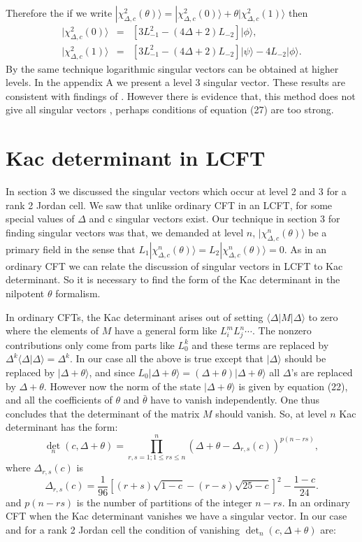 \documentclass[a4paper,11pt]{article}
\begin{document}
Therefore the if we write
$|\chi_{\Delta,c}^{2}(\theta)\rangle=|\chi_{\Delta,c}^{2}(0)\rangle+
\theta|\chi_{\Delta,c}^{2}(1)\rangle$ then
\begin{eqnarray}
|\chi_{\Delta,c}^{2}(0)\rangle&=&\left[3L_{-1}^{2}-(4\Delta+2)L_{-2}\right]|\phi\rangle ,\nonumber\\
|\chi_{\Delta,c}^{2}(1)\rangle&=&\left[3L_{-1}^{2}-(4\Delta+2)L_{-2}\right]
|\psi\rangle-4L_{-2}|\phi\rangle .
\end{eqnarray}
By the same technique logarithmic singular vectors can be obtained
at higher levels. In the appendix A we present a level 3 singular
vector. These results are consistent with findings of
\cite{Fl-Sing}. However there is evidence that, this method does
not give all singular vectors \cite{Private}, perhaps conditions
of equation (27) are too strong.
\section{Kac determinant in LCFT}
In section 3 we discussed the singular vectors which occur at
level 2 and 3 for a rank 2 Jordan cell. We saw that unlike
ordinary CFT in an LCFT, for some special values of $\Delta$ and
c singular vectors exist. Our technique in section 3 for finding
singular vectors was that, we demanded at level $n$,
$|\chi_{\Delta,c}^{n}(\theta)\rangle$ be a primary field in the
sense that $L_{1}|\chi_{\Delta,c}^{n}(\theta)\rangle=L_{2}
|\chi_{\Delta,c}^{n}(\theta)\rangle=0$. As in an ordinary CFT we
can relate the discussion of singular vectors in LCFT to Kac
determinant. So it is necessary to find the form of the Kac
determinant in the nilpotent $\theta$ formalism.

In ordinary CFTs, the Kac determinant arises out of setting
$\langle \Delta|M|\Delta\rangle$ to zero where the elements of $M$
have a general form like $L_{i}^{m}L_{j}^{n}\cdots$. The nonzero
contributions only come from parts like $L_0^k$ and these terms
are replaced by $\Delta^k\langle \Delta|\Delta\rangle=\Delta^k$.
In our case all the above is true except that $|\Delta\rangle$
should be replaced by $|\Delta + \theta\rangle$, and since
$L_0|\Delta + \theta\rangle = (\Delta + \theta)|\Delta +
\theta\rangle$ all $\Delta$'s are replaced by $\Delta + \theta$.
However now the norm of the state $|\Delta + \theta\rangle$ is
given by equation (22), and all the coefficients of $\theta$ and
$\bar{\theta}$ have to vanish independently. One thus concludes
that the determinant of the matrix $M$ should vanish. So, at
level $n$ Kac determinant has the form:
\begin{equation}
{\det}_{n}(c,\Delta+\theta)=\prod_{r,s=1;1 \leq r s\leq
n}^{n}\left(\Delta+\theta-\Delta_{r,s}(c)\right)^{p(n-rs)} ,
\end{equation}
where $\Delta_{r,s}(c)$ is
\begin{equation}
\Delta_{r,s}(c)=
\frac{1}{96}\left[(r+s)\sqrt{1-c}-(r-s)\sqrt{25-c}\right]^{2}
-\frac{1-c}{24} .
\end{equation}
and $p(n-rs)$ is the number of partitions of the integer $n-rs$.
In an ordinary CFT when the Kac determinant vanishes we have a
singular vector. In our case and for a rank 2 Jordan cell the
condition of vanishing $\det_{n}(c,\Delta+\theta)$ are:
\end{document}
